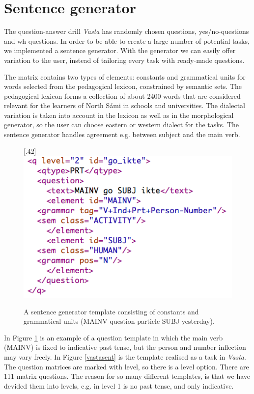 \documentclass[11pt]{article}
\begin{document}
\section{Sentence generator}
The question-answer drill \textit{Vasta} has randomly chosen questions, yes/no-questions and wh-questions. In order to be able to create a large number of potential tasks, we implemented a sentence generator. With the generator we can easily offer variation to the user, instead of tailoring every task with ready-made questions.

The matrix contains two types of elements: constants and grammatical units for words selected from the pedagogical lexicon, constrained by semantic sets. The pedagogical lexicon forms a collection of about 2400 words that are considered relevant for the learners of North Sámi in schools and universities. The dialectal variation is taken into account in the lexicon as well as in the morphological generator, so the user can choose eastern or western dialect for the tasks. The sentence generator handles agreement e.g. between subject and the main verb. 

\begin{figure}[htbp]
\begin{center}
\scalebox{.42}[.42]{\includegraphics{presentation/img/sentencegenerator.png}}\\
\caption{A sentence generator template consisting of constants and grammatical units (MAINV question-particle SUBJ yesterday).}
\label{sentgen}
\end{center}
\end{figure}

In Figure \ref{sentgen} is an example of a question template in which the main verb (MAINV) is fixed to indicative past tense, but the person and number inflection may vary freely. In Figure \ref{vastasent} is the template realised as a task in \textit{Vasta}. The question matrices are marked with level, so there is a level option. There are 111 matrix questions. The reason for so many different templates, is that we have devided them into levels, e.g. in level 1 is no past tense, and only indicative.
\end{document}
